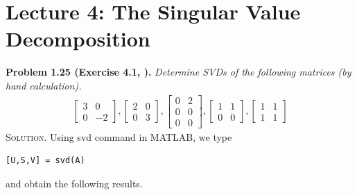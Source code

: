 \documentclass[a4paper,oneside]{book}
\numberwithin{equation}{chapter}
\begin{document}
\section{Lecture 4: The Singular Value Decomposition}
\textbf{Problem 1.25 (Exercise 4.1, \cite{1}).} \textit{Determine SVDs of the following matrices (by hand calculation).}
\begin{align}
\left[ {\begin{array}{*{20}{c}}
3&0\\
0&{ - 2}
\end{array}} \right],\left[ {\begin{array}{*{20}{c}}
2&0\\
0&3
\end{array}} \right],\left[ {\begin{array}{*{20}{c}}
0&2\\
0&0\\
0&0
\end{array}} \right],\left[ {\begin{array}{*{20}{c}}
1&1\\
0&0
\end{array}} \right],\left[ {\begin{array}{*{20}{c}}
1&1\\
1&1
\end{array}} \right]
\end{align}
\textsc{Solution.} Using {svd} command in MATLAB, we type
\begin{verbatim}
[U,S,V] = svd(A)
\end{verbatim}
and obtain the following results.
\end{document}
